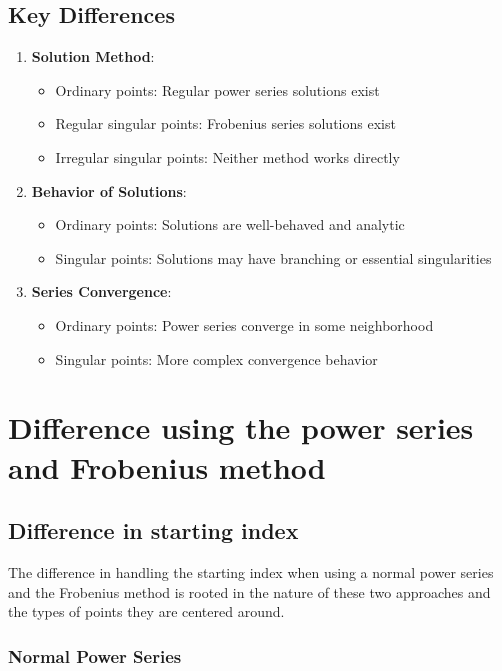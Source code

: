 \subsection{Key Differences}
\begin{enumerate}
    \item \textbf{Solution Method}:
        \begin{itemize}
            \item Ordinary points: Regular power series solutions exist
            \item Regular singular points: Frobenius series solutions exist
            \item Irregular singular points: Neither method works directly
        \end{itemize}
    \item \textbf{Behavior of Solutions}:
        \begin{itemize}
            \item Ordinary points: Solutions are well-behaved and analytic
            \item Singular points: Solutions may have branching or essential singularities
        \end{itemize}
    \item \textbf{Series Convergence}:
        \begin{itemize}
            \item Ordinary points: Power series converge in some neighborhood
            \item Singular points: More complex convergence behavior
        \end{itemize}
\end{enumerate}

\section{Difference using the power series and Frobenius method}
\subsection{Difference in starting index}
The difference in handling the starting index when using a normal power series and the Frobenius method is rooted in the nature of these two approaches and the types of points they are centered around.

\subsubsection{Normal Power Series}

